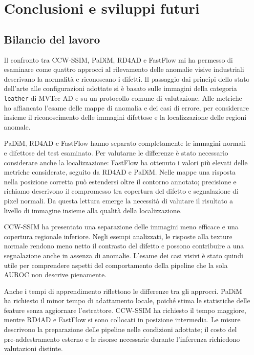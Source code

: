 \chapter{Conclusioni e sviluppi futuri}
\label{chap:conclusioni}

\section{Bilancio del lavoro}

Il confronto tra CCW-SSIM, PaDiM, RD4AD e FastFlow mi ha permesso di esaminare come quattro approcci al rilevamento delle anomalie visive industriali descrivano la normalità e riconoscano i difetti. Il passaggio dai principi dello stato dell'arte alle configurazioni adottate si è basato sulle immagini della categoria \texttt{leather} di MVTec AD e su un protocollo comune di valutazione. Alle metriche ho affiancato l'esame delle mappe di anomalia e dei casi di errore, per considerare insieme il riconoscimento delle immagini difettose e la localizzazione delle regioni anomale.

PaDiM, RD4AD e FastFlow hanno separato completamente le immagini normali e difettose del test esaminato. Per valutarne le differenze è stato necessario considerare anche la localizzazione: FastFlow ha ottenuto i valori più elevati delle metriche considerate, seguito da RD4AD e PaDiM. Nelle mappe una risposta nella posizione corretta può estendersi oltre il contorno annotato; precisione e richiamo descrivono il compromesso tra copertura del difetto e segnalazione di pixel normali. Da questa lettura emerge la necessità di valutare il risultato a livello di immagine insieme alla qualità della localizzazione.

CCW-SSIM ha presentato una separazione delle immagini meno efficace e una copertura regionale inferiore. Negli esempi analizzati, le risposte alla texture normale rendono meno netto il contrasto del difetto e possono contribuire a una segnalazione anche in assenza di anomalie. L'esame dei casi visivi è stato quindi utile per comprendere aspetti del comportamento della pipeline che la sola AUROC non descrive pienamente.

Anche i tempi di apprendimento riflettono le differenze tra gli approcci. PaDiM ha richiesto il minor tempo di adattamento locale, poiché stima le statistiche delle feature senza aggiornare l'estrattore. CCW-SSIM ha richiesto il tempo maggiore, mentre RD4AD e FastFlow si sono collocati in posizione intermedia. Le misure descrivono la preparazione delle pipeline nelle condizioni adottate; il costo del pre-addestramento esterno e le risorse necessarie durante l'inferenza richiedono valutazioni distinte.

